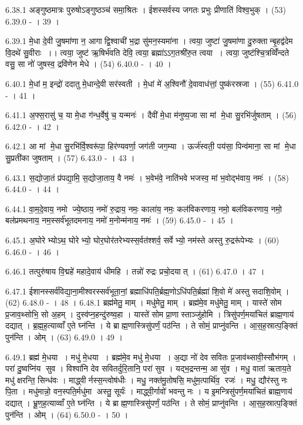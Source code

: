 6.38.1
अङ्गुष्ठमात्रः पुरुषोऽङ्गुष्ठञ्च॑ समा॒श्रितः । ईशस्सर्वस्य जगतः प्रभुः प्रीणाति॑ विश्व॒भुक् । (53)
6.39.0
- । 39 ।
\anuvakamend

6.39.1
मे॒धा दे॒वी जु॒षमा॑णा न॒ आगाद्वि॒श्वाची॑ भ॒द्रा सु॑मन॒स्यमा॑ना । त्वया॒ जुष्टा॑ जु॒षमा॑णा दु॒रुक्तान्बृ॒हद्व॑देम वि॒दथे॑ सु॒वीराः ।। त्वया॒ जुष्ट॑ ऋ॒षिर्भ॑वति देवि॒ त्वया॒ ब्रह्मा॑ऽऽग॒तश्री॑रु॒त त्वया । त्वया॒ जुष्ट॑श्चि॒त्रव्विँ॑न्दते वसु॒ सा नो॑ जुषस्व॒ द्रवि॑णेन मेधे । (54)
6.40.0
- । 40 ।
\anuvakamend

6.40.1
मे॒धां म॒ इन्द्रो॑ ददातु मे॒धान्दे॒वी सर॑स्वती । मे॒धां मे॑ अ॒श्विनौ॑ दे॒वावाध॑त्तां॒ पुष्क॑रस्रजा । (55)
6.41.0
- । 41 ।
\anuvakamend

6.41.1
अ॒फ्स॒रासु॑ च॒ या मे॒धा ग॑न्ध॒र्वेषु॑ च॒ यन्मनः॑ । दैवी॑ मे॒धा म॑नुष्य॒जा सा मां मे॒धा सु॒रभि॑र्जुषताम् । (56)
6.42.0
- । 42 ।
\anuvakamend

6.42.1
आ मां मे॒धा सु॒रभि॑र्वि॒श्वरू॑पा॒ हिर॑ण्यवर्णा॒ जग॑ती जग॒म्या । ऊर्ज॑स्वती॒ पय॑सा॒ पिन्व॑माना॒ सा मां मे॒धा सु॒प्रती॑का जुषताम् । (57)
6.43.0
- । 43 ।
\anuvakamend

6.43.1
स॒द्योजा॒तं प्र॑पद्या॒मि॒ स॒द्योजा॒ताय॒ वै नमः॑ । भ॒वेभ॑वे॒ नाति॑भवे भजस्व॒ मां भ॒वोद्भ॑वाय॒ नमः॑ । (58)
6.44.0
- । 44 ।
\anuvakamend

6.44.1
वा॒म॒दे॒वाय॒ नमो ज्ये॒ष्ठाय॒ नमो॑ रु॒द्राय॒ नमः॒ काला॑य॒ नमः॒ कल॑विकरणाय॒ नमो॒ बल॑विकरणाय॒ नमो॒ बल॑प्रमथनाय॒ नम॒स्सर्व॑भूतदमनाय॒ नमो॑ म॒नोन्म॑नाय॒ नमः॑ । (59)
6.45.0
- । 45 ।
\anuvakamend

6.45.1
अ॒घोरेभ्योऽथ॒ घोरेभ्यो॒ घोर॒घोर॑तरेभ्यस्स॒र्वत॑श्शर्व॒ सर्वेभ्यो॒ नम॑स्ते अस्तु रु॒द्ररू॑पेभ्यः । (60)
6.46.0
- । 46 ।
\anuvakamend

6.46.1
तत्पुरु॑षाय वि॒द्महे॑ महादे॒वाय॑ धीमहि । तन्नो॑ रुद्रः प्रचो॒दयात् । (61)
6.47.0
। 47 ।
\anuvakamend

6.47.1
ईशानस्सर्व॑विद्या॒ना॒मीश्वरस्सर्व॑भूता॒नां॒ ब्रह्माधि॑पति॒र्ब्रह्म॒णोऽधि॑पति॒र्ब्रह्मा॑ शि॒वो मे॑ अस्तु सदाशि॒वोम् । (62)
6.48.0
- । 48 ।
6.48.1
ब्रह्म॑मेतु॒ माम् । मधु॑मेतु॒ माम् । ब्रह्म॑मे॒व मधु॑मेतु॒ माम् । यास्ते॑ सोम प्र॒जाव॒थ्सोभि॒ सो अ॒हम् । दुस्व॑प्न॒हन्दु॑रुष्व॒हा । यास्ते॑ सोम प्रा॒णास्ताञ्जु॑होमि । त्रिसु॑पर्ण॒मया॑चितं ब्राह्म॒णाय॑ दद्यात् । ब्र॒ह्म॒ह॒त्याव्वाँ ए॒ते घ्न॑न्ति । ये ब्राह्म॒णास्त्रिसु॑पर्णं॒ पठ॑न्ति । ते सोमं॒ प्राप्नु॑वन्ति । आ॒स॒ह॒स्रात्प॒ङ्क्तिं पुन॑न्ति । ओम् । (63)
6.49.0
। 49 ।
\anuvakamend

6.49.1
ब्रह्म॑ मे॒धया । मधु॑ मे॒धया । ब्रह्म॑मे॒व मधु॑ मे॒धया । अ॒द्या नो॑ देव सवितः प्र॒जाव॑थ्सावी॒स्सौभ॑गम् । परा॑ दु॒ष्वप्नि॑य सुव । विश्वा॑नि देव सवितर्दुरि॒तानि॒ परा॑ सुव । यद्भ॒द्रन्तन्म॒ आ सु॑व । मधु॒ वाता॑ ऋताय॒ते मधु॑ क्षरन्ति॒ सिन्ध॑वः । माद्ध्वीर्नस्स॒न्त्वोष॑धीः । मधु॒ नक्त॑मु॒तोषसि॒ मधु॑म॒त्पार्थि॑व॒ रजः॑ । मधु॒ द्यौर॑स्तु नः पि॒ता । मधु॑मान्नो॒ वन॒स्पति॒र्मधु॑मा अस्तु॒ सूर्यः॑ । माद्ध्वी॒र्गावो॑ भवन्तु नः । य इ॒मन्त्रिसु॑पर्ण॒मया॑चितं ब्राह्म॒णाय॑ दद्यात् । भ्रू॒ण॒ह॒त्याव्वाँ ए॒ते घ्न॑न्ति । ये ब्राह्म॒णास्त्रिसु॑पर्णं॒ पठ॑न्ति । ते सोमं॒ प्राप्नु॑वन्ति । आ॒स॒ह॒स्रात्प॒ङ्क्तिं पुन॑न्ति । ओम् । (64)
6.50.0
- । 50 ।
\anuvakamend

